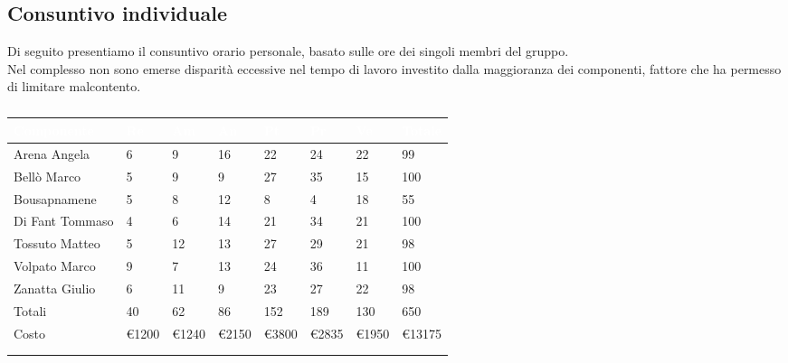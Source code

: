     \subsection{Consuntivo individuale} 
    Di seguito presentiamo il consuntivo orario personale, basato sulle ore dei singoli membri
    del gruppo. \\
    Nel complesso non sono emerse disparità eccessive nel tempo di lavoro investito dalla maggioranza
    dei componenti, fattore che ha permesso di limitare malcontento.
    {
        \setlength{\freewidth}{\dimexpr\textwidth-30\tabcolsep}
            \renewcommand{\arraystretch}{1.0}
            \setlength{\aboverulesep}{0pt}
            \setlength{\belowrulesep}{0pt}
            \begin{longtable}{C{.4\freewidth} C{.11\freewidth} C{.11\freewidth} C{.11\freewidth} C{.11\freewidth} C{.11\freewidth} C{.11\freewidth} C{.15\freewidth}}
            \toprule
            \textcolor{white}{\textbf{Componente}}&
            \textcolor{white}{\textbf{Re}}&
            \textcolor{white}{\textbf{Am}}&
            \textcolor{white}{\textbf{An}}&
            \textcolor{white}{\textbf{Pt}}&
            \textcolor{white}{\textbf{Pr}}&
            \textcolor{white}{\textbf{Ve}}&
            \textcolor{white}{\textbf{Totale}} \\
        
            \toprule
            \endhead
    
            Arena Angela & 6 & 9 & 16 & 22 & 24 & 22 & 99\\      
            Bellò Marco & 5 & 9 & 9 & 27 & 35 & 15 & 100\\      
            Bousapnamene & 5 & 8 & 12 & 8 & 4 & 18 & 55\\      
            Di Fant Tommaso & 4 & 6 & 14 & 21 & 34 & 21 & 100\\      
            Tossuto Matteo & 5 & 12 & 13 & 27 & 29 & 21 & 98 \\      
            Volpato Marco & 9 & 7 & 13 & 24 & 36 & 11 &  100 \\      
            Zanatta Giulio & 6 & 11 & 9 & 23 & 27 & 22 & 98 \\      
            Totali & 40 & 62 & 86 & 152 & 189 & 130 & 650 \\
            Costo & \euro1200 & \euro1240 & \euro2150 & \euro3800 & \euro2835 & \euro1950 &  \euro13175 \\
            \bottomrule
            \\
            \caption{}

            \end{longtable}
    }

